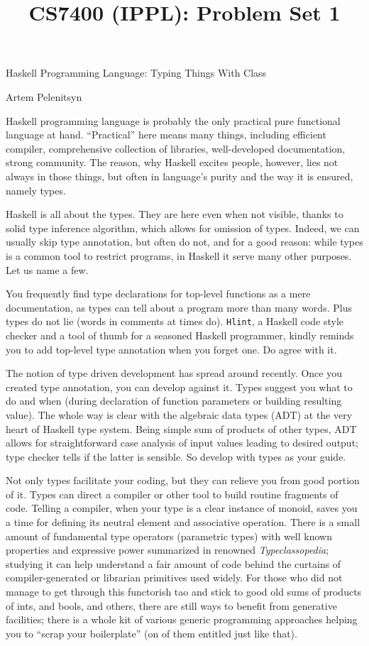 \documentclass[11pt]{article}
\title{CS7400 (IPPL): Problem Set 1}
\begin{document}
\begin{center}
Haskell Programming Language: Typing Things With Class\\\hspace{0cm}

Artem Pelenitsyn

\vspace{.2cm}
\end{center}

Haskell programming language is probably the only practical pure functional language at hand. ``Practical'' here means many things, including efficient compiler, comprehensive collection of libraries, well-developed documentation, strong community. The reason, why Haskell excites people, however, lies not always in those things, but often in language's purity and the way it is ensured, namely types.

Haskell is all about the types. They are here even when not visible, thanks to solid type inference algorithm, which allows for omission of types. Indeed, we can usually skip type annotation, but often do not, and for a good reason: while types is a common tool to restrict programs, in Haskell it serve many other purposes. Let us name a few.

You frequently find type declarations for top-level functions as a mere documentation, as types can tell about a program more than many words. Plus types do not lie (words in comments at times do). \texttt{Hlint}, a Haskell code style checker and a tool of thumb for a seasoned Haskell programmer, kindly reminds you to add top-level type annotation when you forget one. Do agree with it.

The notion of type driven development has spread around recently. Once you created type annotation, you can develop against it. Types suggest you what to do and when (during declaration of function parameters or building resulting value). The whole way is clear with the algebraic data types (ADT) at the very heart of Haskell type system. Being simple sum of products of other types, ADT allows for straightforward case analysis of input values leading to desired output; type checker tells if the latter is sensible. So develop with types as your guide.

Not only types facilitate your coding, but they can relieve you from good portion of it. Types can direct a compiler or other tool to build routine fragments of code. Telling a compiler, when your type is a clear instance of monoid, saves you a time for defining its neutral element and associative operation. There is a small amount of fundamental type operators (parametric types) with well known properties and expressive power summarized in renowned \emph{Typeclassopedia}; studying it can help understand a fair amount of code behind the curtains of compiler-generated or librarian primitives used widely. For those who did not manage to get through this functorish tao and stick to good old sums of products of ints, and bools, and others, there are still ways to benefit from generative facilities; there is a whole kit of various generic programming approaches helping you to ``scrap your boilerplate'' (on of them entitled just like that).
\end{document}

